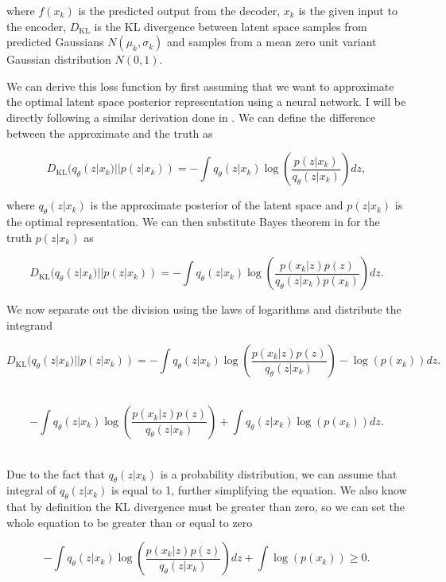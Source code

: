 where $f(x_k)$ is the predicted output from the decoder, $x_k$
is the given input to the encoder, $D_{\textrm{KL}}$ is the \ac{KL} divergence 
between latent space samples from predicted Gaussians $N(\mu_k, \sigma_k)$ 
and samples from a mean zero unit variant Gaussian 
distribution $N(0,1)$. 

We can derive this loss function by first assuming that we 
want to approximate the optimal latent space posterior 
representation using a neural network. I will be directly following a 
similar derivation done in \cite{1907.08956}. We can define the 
difference between the approximate and the truth as 

\begin{equation}
    D_{\textrm{KL}}(q_{\theta}(z|x_k) || p(z|x_k)) = -\int q_{\theta}(z|x_k) \log(\frac{p(z|x_k)}{q_{\theta}(z|x_k)}) dz,
\end{equation}

where $q_{\theta}(z|x_k)$ is the approximate posterior of the 
latent space and $p(z|x_k)$ is the optimal representation. 
We can then substitute Bayes theorem in for the truth 
$p(z|x_k)$ as 

\begin{equation}
    D_{\textrm{KL}}(q_{\theta}(z|x_k) || p(z|x_k)) = -\int q_{\theta}(z|x_k) 
    \log(\frac{p(x_k|z) p(z)}{q_{\theta}(z|x_k) p(x_k)}) dz. 
\end{equation}

We now separate out the division using the laws of logarithms and 
distribute the integrand

\begin{equation}
    D_{\textrm{KL}}(q_{\theta}(z|x_k) || p(z|x_k)) = -\int q_{\theta}(z|x_k) 
    \log(\frac{p(x_k|z) p(z)}{q_{\theta}(z|x_k)}) - \log(p(x_k)) dz. 
\end{equation}\

\begin{equation}
    -\int q_{\theta}(z|x_k) 
    \log(\frac{p(x_k|z) p(z)}{q_{\theta}(z|x_k)}) +
    \int q_{\theta}(z|x_k) \log(p(x_k)) dz. 
\end{equation}\

Due to the fact that $q_{\theta}(z|x_k)$ is a probability distribution, 
we can assume that integral of $q_{\theta}(z|x_k)$ is equal to 1, 
further simplifying the equation. We also know that by definition the KL 
divergence must be greater than zero, so we can set the whole 
equation to be greater than or equal to zero

\begin{equation}
    -\int q_{\theta}(z|x_k)
    \log(\frac{p(x_k|z) p(z)}{q_{\theta}(z|x_k)})dz +
    \int \log(p(x_k)) \geq 0. 
\end{equation}\

